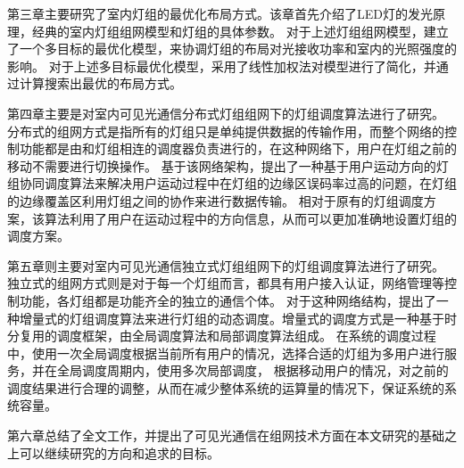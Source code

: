 第三章主要研究了室内灯组的最优化布局方式。该章首先介绍了LED灯的发光原理，经典的室内灯组组网模型和灯组的具体参数。
对于上述灯组组网模型，建立了一个多目标的最优化模型，来协调灯组的布局对光接收功率和室内的光照强度的影响。
对于上述多目标最优化模型，采用了线性加权法对模型进行了简化，并通过计算搜索出最优的布局方式。

第四章主要是对室内可见光通信分布式灯组组网下的灯组调度算法进行了研究。
分布式的组网方式是指所有的灯组只是单纯提供数据的传输作用，而整个网络的控制功能都是由和灯组相连的调度器负责进行的，在这种网络下，用户在灯组之前的移动不需要进行切换操作。
基于该网络架构，提出了一种基于用户运动方向的灯组协同调度算法来解决用户运动过程中在灯组的边缘区误码率过高的问题，在灯组的边缘覆盖区利用灯组之间的协作来进行数据传输。
相对于原有的灯组调度方案，该算法利用了用户在运动过程中的方向信息，从而可以更加准确地设置灯组的调度方案。

第五章则主要对室内可见光通信独立式灯组组网下的灯组调度算法进行了研究。
独立式的组网方式则是对于每一个灯组而言，都具有用户接入认证，网络管理等控制功能，各灯组都是功能齐全的独立的通信个体。
对于这种网络结构，提出了一种增量式的灯组调度算法来进行灯组的动态调度。增量式的调度方式是一种基于时分复用的调度框架，由全局调度算法和局部调度算法组成。
在系统的调度过程中，使用一次全局调度根据当前所有用户的情况，选择合适的灯组为多用户进行服务，并在全局调度周期内，使用多次局部调度，
根据移动用户的情况，对之前的调度结果进行合理的调整，从而在减少整体系统的运算量的情况下，保证系统的系统容量。

第六章总结了全文工作，并提出了可见光通信在组网技术方面在本文研究的基础之上可以继续研究的方向和追求的目标。 